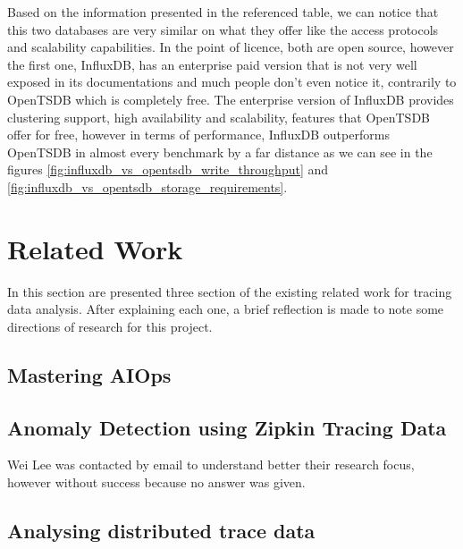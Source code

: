 Based on the information presented in the referenced table, we can notice that this two databases are very similar on what they offer like the access protocols and scalability capabilities. In the point of licence, both are open source, however the first one, InfluxDB, has an enterprise paid version that is not very well exposed in its documentations and much people don't even notice it, contrarily to OpenTSDB which is completely free. The enterprise version of InfluxDB provides clustering support, high availability and scalability\cite{influxdb_vs_opentsdb}, features that OpenTSDB offer for free, however in terms of performance, InfluxDB outperforms OpenTSDB in almost every benchmark by a far distance as we can see in the figures \ref{fig:influxdb_vs_opentsdb_write_throughput} and \ref{fig:influxdb_vs_opentsdb_storage_requirements}.

\section{Related Work}
\label{sec:related_work}

In this section are presented three section of the existing related work for tracing data analysis. After explaining each one, a brief reflection is made to note some directions of research for this project.

\subsection{Mastering AIOps}
\label{subsec:mastering_aiops}


\cite{mastering_aiops}

\subsection{Anomaly Detection using Zipkin Tracing Data}
\label{subsec:anomaly_detection_using_zipkin_tracing_data}


\cite{anomaly_detection_zipkin_tracing_data}

Wei Lee was contacted by email to understand better their research focus, however without success because no answer was given.

\subsection{Analysing distributed trace data}
\label{subsec:analysing_distributed_trace_data}

